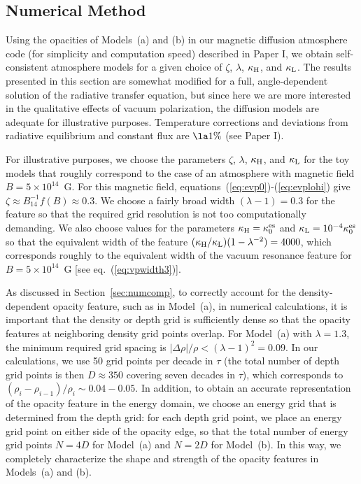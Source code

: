 \documentclass{mn2e}
\newcommand{\keso}{\kappa^{\rm es}_0}
\newcommand{\holai}{Paper I}
\newcommand{\kaph}{\kappa_{\rm H}}
\newcommand{\kapl}{\kappa_{\rm L}}
\begin{document}
{{%
\subsection{Numerical Method} \label{sec:numcomptoy}

Using the opacities of Models~(a) and (b)
in our magnetic diffusion atmosphere code (for simplicity and
computation speed)
described in \holai, we obtain self-consistent atmosphere
models for a given choice of $\zeta$, $\lambda$, $\kaph$, and $\kapl$.
The results presented in this section are somewhat modified for
a full, angle-dependent solution of the radiative transfer equation,
but since here we are more interested in the qualitative effects of
vacuum polarization, the diffusion models are adequate for illustrative
purposes.
Temperature corrections and deviations from radiative equilibrium
and constant flux are $\la 1\%$ (see \holai).

For illustrative purposes, we choose the parameters $\zeta$, $\lambda$,
$\kaph$, and $\kapl$ for the toy models that roughly correspond to
the case of an atmosphere with magnetic field $B=5\times 10^{14}$~G.
For this magnetic field, equations~(\ref{eq:evp0})-(\ref{eq:evplohi})
give $\zeta\approx B_{14}^{-1}f(B)\approx 0.3$.
We choose a fairly broad width $(\lambda-1)=0.3$ for the feature
so that the required grid resolution is not too computationally
demanding.  We also choose values for the parameters $\kaph=\keso$
and $\kapl=10^{-4}\keso$ so that the equivalent width of the feature
$(\kaph/\kapl)(1-\lambda^{-2})=4000$, which corresponds roughly
to the equivalent width of the vacuum resonance feature for
$B=5\times 10^{14}$~G [see eq.~(\ref{eq:vpwidth3})].

As discussed in Section~\ref{sec:numcomp}, to correctly account
for the density-dependent opacity feature, such as in Model~(a),
in numerical calculations, it is important that the density or
depth grid is sufficiently dense so that the opacity features
at neighboring density grid points overlap.
For Model~(a) with $\lambda=1.3$, the minimum required grid
spacing is $|\Delta\rho|/\rho<(\lambda-1)^2=0.09$.  In our calculations,
we use 50 grid points per decade in $\tau$ (the total number of
depth grid points is then $D\approx 350$ covering seven decades
in $\tau$), which corresponds to $(\rho_{i}-\rho_{i-1})/\rho_i\sim 0.04-0.05$.
In addition, to obtain an accurate representation of the opacity
feature in the energy domain, we choose an energy grid that
is determined from the depth grid: for each depth grid point,
we place an energy grid point on either side of the opacity edge,
so that the total number of energy grid points $N=4D$ for Model~(a)
and $N=2D$ for Model~(b).  In this way, we completely characterize
the shape and strength of the opacity features in Models~(a) and (b).

}}
\end{document}

